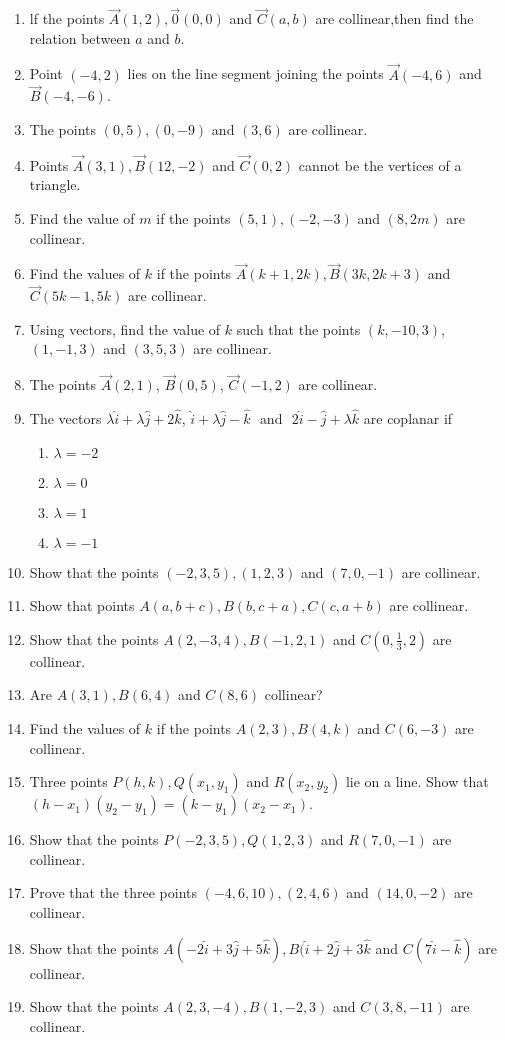 \begin{enumerate}[label=\thesubsection.\arabic*,ref=\thesubsection.\theenumi]
\item lf the points $\vec{A}(1,2),\vec{0}(0,0)$ and $\vec{C}(a,b)$ are collinear,then find the relation between $a$ and $b$.
	\item Point $ (-4,2)$ lies on the line segment joining the points $ \vec{A}(-4,6)$  and  $\vec{B}(-4,-6)$.
 \item The points $(0,5),(0,-9)$ and $(3,6)$ are collinear.
\item Points $\vec{A}(3,1), \vec{B}(12,-2)$  and  $\vec {C}(0,2)$ cannot be the vertices of a triangle.
\item Find the value of $m$ if the points $(5,1),(-2,-3)$  and $(8,2m)$ are collinear.
\item Find the values of $k$ if the points $\vec{A}(k+1,2k),\vec{B}(3k,2k+3)$ and $\vec{C}(5k-1,5k)$ are collinear.
\item Using vectors, find the value of $k$ such that the points $(k,-10,3)$, $(1,-1,3)$  and  $(3,5,3)$ are collinear.
\item The points $\vec{A}(2,1)$, $\vec{B}(0,5)$, $\vec{C}(-1,2)$ are collinear.
\item The vectors $\lambda\hat{i}+\lambda\hat{j}+2\hat{k}$, $\hat{i}+\lambda\hat{j}-\hat{k}$ $\text{ and }$ $2\hat{i}-\hat{j}+\lambda\hat{k}$ are coplanar if
	\begin{enumerate}
\item	$\lambda=-2$
\item $\lambda=0$
\item $\lambda=1$
\item	$\lambda=-1$
\end{enumerate}
\item Show that the points $(-2,3,5), (1,2,3)$ and $(7,0,-1)$ are collinear.
\item Show that points $A(a, b+c), B(b, c+a), C(c, a+b)$ are collinear.
\item Show that the points $A(2,-3,4), B(-1,2,1)$ and $C(0,\frac{1}{3},2)$ are collinear.
\item Are $A(3,1),B(6,4)$ and $C(8,6)$ collinear?
\item Find the values of $k$ if the points $A(2,3), B(4,k)$ and $C(6,-3)$ are collinear.
\item Three points $P(h,k), Q(x_1,y_1)$ and $R(x_2,y_2)$ lie on a line. Show that $(h-x_1)(y_2-y_1)=(k-y_1)(x_2-x_1)$.
\item Show that the points $P(-2,3,5), Q(1,2,3)$ and $R(7,0,-1)$ are collinear. 
\item Prove that the three points $(-4,6,10), (2,4,6)$ and $(14,0,-2)$ are collinear.
\item Show that the points $A(-2\hat{i} +3\hat{j} +5\hat{k}), B(\hat{i}+2\hat{j} +3\hat{k}$ and $C(7\hat{i} -\hat{k})$ are collinear.
\item Show that the points $A(2, 3, -4), B(1, -2, 3)$ and $C(3, 8, -11)$ are collinear.
\end{enumerate}
